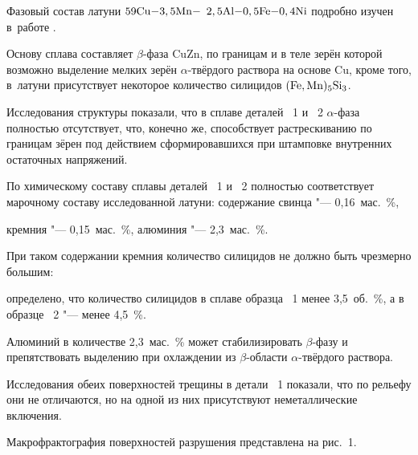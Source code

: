 \smallskip




Фазовый состав латуни $\rm 59Cu{-}3,5Mn{-}$ \linebreak $\rm 2,5Al{-}0,5Fe{-}0,4Ni$ подробно изучен в~работе \cite{pugacheva:bib2}. 

Основу сплава составляет $\beta$-фаза CuZn, по границам и в теле зерён  которой возможно выделение мелких зерён $\alpha$-твёрдого раствора на основе Cu, кроме того, в~латуни присутствует некоторое количество силицидов $\rm (Fe,Mn)_{5}Si_{3}$. 

Исследования структуры показали, что в сплаве деталей \No\ 1 и \No\ 2 $\alpha$-фаза полностью отсутствует, что, конечно же, способствует растрескиванию по границам зёрен под действием сформировавшихся при штамповке внутренних остаточных напряжений.



По химическому составу сплавы деталей \No\ 1 и \No\ 2 полностью соответствует марочному составу исследованной латуни: содержание свинца "--- 0,16~мас.~\%,

кремния "--- 0,15~мас.~\%, алюминия "--- 2,3~мас.~\%.

При таком содержании кремния количество силицидов не должно быть чрезмерно большим:

определено, что количество силицидов в сплаве образца \No\ 1 менее 3,5~об.~\%, а в образце \No\ 2 "--- менее 4,5~\%. 

Алюминий в количестве 2,3~мас.~\% может стабилизировать $\beta$-фазу и препятствовать выделению при охлаждении из $\beta $-области $\alpha $-твёрдого раствора.












Исследования обеих поверхностей трещины в детали \No\ 1 показали, что по рельефу они не отличаются, но на одной из них присутствуют неметаллические включения. 

Макрофрактография поверхностей разрушения представлена на рис.~1. 

